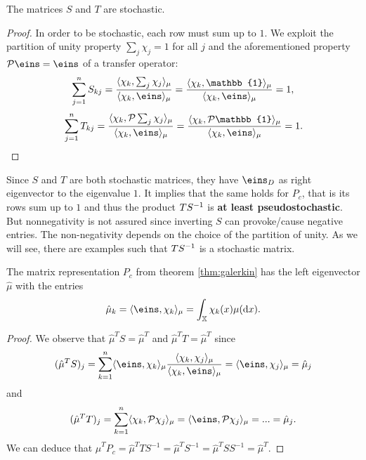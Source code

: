 \begin{thm}
The matrices $S$ and $T$ are stochastic. 
\end{thm}
\begin{proof}
In order to be stochastic, each row must sum up to $1$. We exploit the partition of unity property $\sum_j \chi_j = 1$ for all $j$ and the aforementioned property $\Pcal  \eins =  \eins$ of a transfer operator:
\begin{equation*}
\sum_{j=1}^n S_{kj}
= \frac{\langle \chi_k, \sum_j\chi_j \rangle_\mu}{\langle \chi_k, \eins \rangle_\mu}
= \frac{\langle \chi_k, \mathbb{1} \rangle_\mu}{\langle \chi_k, \eins \rangle_\mu} =1,
\end{equation*}
\begin{equation*}
\sum_{j=1}^n T_{kj}
= \frac{\langle \chi_k, \Pcal \sum_j \chi_j \rangle_\mu}{\langle \chi_k, \eins \rangle_\mu}
= \frac{\langle \chi_k, \Pcal \mathbb{1} \rangle_\mu}{\langle \chi_k, \eins \rangle_\mu} = 1.
\end{equation*}
\end{proof}
Since $S$ and $T$ are both stochastic matrices, they have $\eins_D$ as right eigenvector to the eigenvalue $1$. It implies that the same holds for $P_c$, that is
its rows sum up to $1$ and thus the product $TS^{-1}$ is \textbf{at least pseudostochastic}. But nonnegativity is not assured since inverting $S$ can provoke/cause negative entries. The non-negativity depends on the choice of the partition of unity. As we will see, there are examples such that $TS^{-1}$ is a stochastic matrix.

\begin{thm}
\label{thm:lefteigenvector}
The matrix representation $P_c$ from theorem \ref{thm:galerkin} has the left eigenvector $\hat{\mu}$ with the entries
\begin{equation*}
\hat{\mu}_k = \langle \eins, \chi_k \rangle_\mu = \int_\X \chi_k(x) \mu(\diff x).
\end{equation*}
\end{thm}

\begin{proof}
We observe that $\hat{\mu}^T S = \hat{\mu}^T$ and $\hat{\mu}^T T = \hat{\mu}^T$ since
\begin{equation*}
(\hat{\mu}^T S)_j = \sum_{k=1}^n  \langle \eins, \chi_k \rangle_\mu \frac{\langle \chi_k, \chi_j \rangle_\mu}{\langle \chi_k, \eins \rangle_\mu}
= \langle \eins, \chi_j \rangle_\mu = \hat{\mu}_j
\end{equation*}
and
\begin{equation*}
(\hat{\mu}^T T)_j = \sum_{k=1}^n \langle \chi_k, \Pcal \chi_j \rangle_\mu = \langle \eins, \Pcal \chi_j \rangle_\mu
= ... = \hat{\mu}_j.
\end{equation*}
We can deduce that $\hat{\mu}^T P_c = \hat{\mu}^T TS^{-1} = \hat{\mu}^T S^{-1} = \hat{\mu}^T SS^{-1} = \hat{\mu}^T$.
\end{proof}

